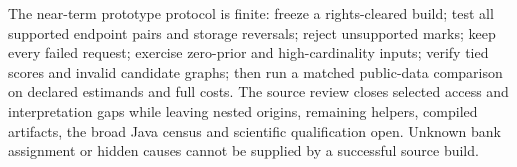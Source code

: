 The near-term prototype protocol is finite: freeze a rights-cleared build;
test all supported endpoint pairs and storage reversals; reject unsupported
marks; keep every failed request; exercise zero-prior and high-cardinality
inputs; verify tied scores and invalid candidate graphs; then run a matched
public-data comparison on declared estimands and full costs. The source
review closes selected access and interpretation gaps while leaving nested
origins, remaining helpers, compiled artifacts, the broad Java census and
scientific qualification open. Unknown bank assignment or hidden causes
cannot be supplied by a successful source build.~\citep{exec28_nested_sources}

